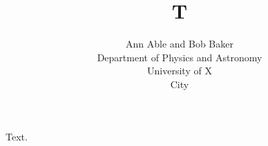 \documentclass[journal]{IEEEtran}
\begin{document}
\title{T}
\author{Ann Able and Bob Baker
\begin{center}
Department of Physics and Astronomy\\ University of X\\ City
\end{center}}
\maketitle
Text.
\end{document}
